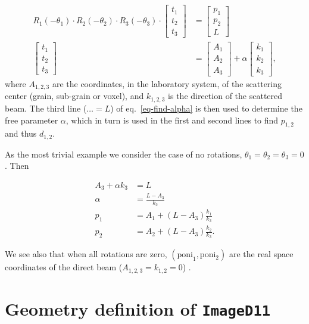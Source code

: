 \documentclass[12pt]{article}
\begin{document}
\begin{align}
  R_1(-\theta_1)\cdot R_2(-\theta_2) \cdot R_3(-\theta_3) \cdot
  \begin{bmatrix} t_1 \\ t_2 \\ t_3
  \end{bmatrix}
  & =
  \begin{bmatrix} p_1 \\ p_2 \\ L \end{bmatrix}
  \label{eq-find-alpha}
  \\
  \begin{bmatrix}
    t_1 \\ t_2 \\ t_3
  \end{bmatrix}
  & =
  \begin{bmatrix}
    A_1  \\ A_2 \\ A_3
  \end{bmatrix}
  + \alpha
  \begin{bmatrix}
    k_1 \\ k_2 \\ k_3
  \end{bmatrix},
\end{align}
where $A_{1,2,3}$ are the coordinates, in the laboratory system, of
the scattering center (grain, sub-grain or voxel), and $k_{1,2,3}$ is
the direction of the scattered beam. The third line ($\ldots = L$) of
eq.~\ref{eq-find-alpha} is then used to determine the free parameter
$\alpha$, which in turn is used in the first and second lines to find
$p_{1,2}$ and thus $d_{1,2}$.

As the most trivial example we consider the case of no rotations,
$\theta_1 = \theta_2 = \theta_3 = 0$. Then

\begin{align}
  A_3 + \alpha k_3 & = L \\
  \alpha & = \frac{L-A_3}{k_3} \\
  p_1 & = A_1 + (L-A_3) \frac{k_1}{k_3} \\
  p_2 & = A_2 + (L-A_3) \frac{k_2}{k_3}.
\end{align}

We see also that when all rotations are zero, $(\mathrm{poni}_1,
\mathrm{poni_2})$ are the real space coordinates of the direct beam
($A_{1,2,3}=k_{1,2}=0$) .

\section{Geometry definition of \texttt{ImageD11}}
\end{document}
